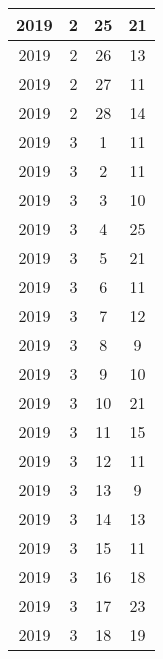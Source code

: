 \begin{longtable} {|c|c|c|c|}
\hline
2019         & 2            & 25           & 21                        \\ 
\hline
2019         & 2            & 26           & 13                        \\ 
\hline
2019         & 2            & 27           & 11                        \\ 
\hline
2019         & 2            & 28           & 14                        \\ 
\hline
2019         & 3            & 1            & 11                        \\ 
\hline
2019         & 3            & 2            & 11                        \\ 
\hline
2019         & 3            & 3            & 10                        \\ 
\hline
2019         & 3            & 4            & 25                        \\ 
\hline
2019         & 3            & 5            & 21                        \\ 
\hline
2019         & 3            & 6            & 11                        \\ 
\hline
2019         & 3            & 7            & 12                        \\ 
\hline
2019         & 3            & 8            & 9                         \\ 
\hline
2019         & 3            & 9            & 10                        \\ 
\hline
2019         & 3            & 10           & 21                        \\ 
\hline
2019         & 3            & 11           & 15                        \\ 
\hline
2019         & 3            & 12           & 11                        \\ 
\hline
2019         & 3            & 13           & 9                         \\ 
\hline
2019         & 3            & 14           & 13                        \\ 
\hline
2019         & 3            & 15           & 11                        \\ 
\hline
2019         & 3            & 16           & 18                        \\ 
\hline
2019         & 3            & 17           & 23                        \\ 
\hline
2019         & 3            & 18           & 19                        \\ 

\end{longtable}
